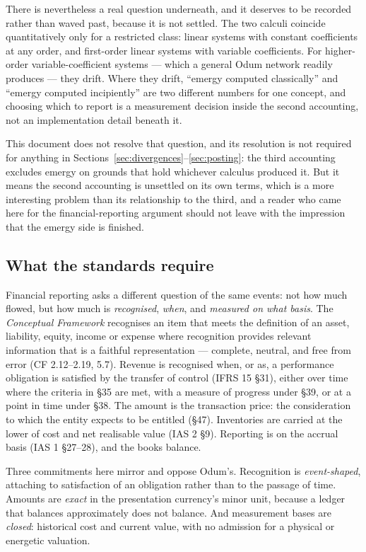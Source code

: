 \documentclass[11pt,a4paper]{article}
\begin{document}
There is nevertheless a real question underneath, and it deserves to be recorded rather than waved past, because it is not settled. The two calculi coincide quantitatively only for a restricted class: linear systems with constant coefficients at any order, and first-order linear systems with variable coefficients. For higher-order variable-coefficient systems --- which a general Odum network readily produces --- they drift. Where they drift, ``emergy computed classically'' and ``emergy computed incipiently'' are two different numbers for one concept, and choosing which to report is a measurement decision inside the second accounting, not an implementation detail beneath it.

This document does not resolve that question, and its resolution is not required for anything in Sections~\ref{sec:divergences}--\ref{sec:posting}: the third accounting excludes emergy on grounds that hold whichever calculus produced it. But it means the second accounting is unsettled on its own terms, which is a more interesting problem than its relationship to the third, and a reader who came here for the financial-reporting argument should not leave with the impression that the emergy side is finished.

\subsection{What the standards require}
\label{sec:standards}

Financial reporting asks a different question of the same events: not how much flowed, but how much is \emph{recognised}, \emph{when}, and \emph{measured on what basis}. The \emph{Conceptual Framework} recognises an item that meets the definition of an asset, liability, equity, income or expense where recognition provides relevant information that is a faithful representation --- complete, neutral, and free from error (CF 2.12--2.19, 5.7). Revenue is recognised when, or as, a performance obligation is satisfied by the transfer of control (IFRS 15 \S31), either over time where the criteria in \S35 are met, with a measure of progress under \S39, or at a point in time under \S38. The amount is the transaction price: the consideration to which the entity expects to be entitled (\S47). Inventories are carried at the lower of cost and net realisable value (IAS 2 \S9). Reporting is on the accrual basis (IAS 1 \S27--28), and the books balance.

Three commitments here mirror and oppose Odum's. Recognition is \emph{event-shaped}, attaching to satisfaction of an obligation rather than to the passage of time. Amounts are \emph{exact} in the presentation currency's minor unit, because a ledger that balances approximately does not balance. And measurement bases are \emph{closed}: historical cost and current value, with no admission for a physical or energetic valuation.
\end{document}
